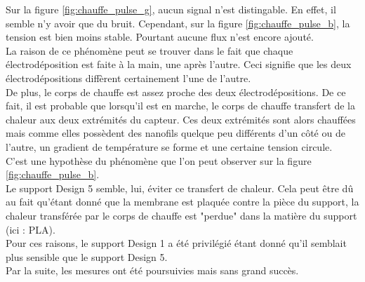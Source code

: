 Sur la figure \ref*{fig:chauffe_pulse_g}, aucun signal n'est distingable. En effet, il semble n'y avoir que du bruit. Cependant, sur la figure
\ref*{fig:chauffe_pulse_b}, la tension est bien moins stable. Pourtant aucune flux n'est encore ajouté. \\

La raison de ce phénomène peut se trouver dans le fait que chaque électrodéposition est faite à la main, une après l'autre. Ceci signifie que
les deux électrodépositions diffèrent certainement l'une de l'autre. \\
De plus, le corps de chauffe est assez proche des deux électrodépositions. De ce fait, il est probable que lorsqu'il est en marche, le corps de
chauffe transfert de la chaleur aux deux extrémités du capteur. Ces deux extrémités sont alors chauffées mais comme elles possèdent des nanofils
quelque peu différents d'un côté ou de l'autre, un gradient de température se forme et une certaine tension circule. \\
C'est une hypothèse du phénomène que l'on peut observer sur la figure \ref*{fig:chauffe_pulse_b}.\\

Le support Design 5 semble, lui, éviter ce transfert de chaleur. Cela peut être dû au fait qu'étant donné que la membrane est plaquée contre
la pièce du support, la chaleur transférée par le corps de chauffe est "perdue" dans la matière du support (ici : PLA).\\

Pour ces raisons, le support Design 1 a été privilégié étant donné qu'il semblait plus sensible que le support Design 5.\\

Par la suite, les mesures ont été poursuivies mais sans grand succès.

